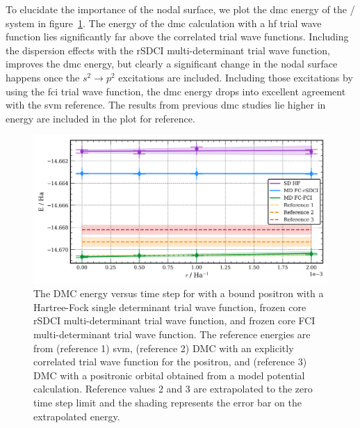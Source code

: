 To elucidate the importance of the nodal surface, we plot the \gls{dmc} energy of the / system in figure~\ref{fig:be_md_extrap}.
The energy of the \gls{dmc} calculation with a \gls{hf} trial wave function lies significantly far above the correlated trial wave functions.
Including the dispersion effects with the \gls{rSDCI} multi-determinant trial wave function, improves the \gls{dmc} energy, but clearly a significant change in the nodal surface happens once the $s^2\rightarrow p^2$ excitations are included.
Including those excitations by using the \gls{fci} trial wave function, the \gls{dmc} energy drops into excellent agreement with the \gls{svm} reference.
The results from previous \gls{dmc} studies lie higher in energy are included in the plot for reference.\cite{10.1021/acs.jctc.1c01193, 10.1063/1.1486447}

\begin{figure}
    \includegraphics[width=\columnwidth,keepaspectratio]{Images/chapter5/be_extrap_multidet.png}
    \caption{\label{fig:be_md_extrap} The DMC energy versus time step for  with a bound positron with a Hartree-Fock single determinant trial wave function, frozen core rSDCI multi-determinant trial wave function, and frozen core FCI multi-determinant trial wave function. The reference energies are from (reference 1) \gls{svm}\cite{10.4208/jams.071510.072110a}, (reference 2) DMC with an explicitly correlated trial wave function for the positron\cite{10.1021/acs.jctc.1c01193}, and (reference 3) DMC with a positronic orbital obtained from a model potential calculation\cite{10.1063/1.1486447}. Reference values 2 and 3 are extrapolated to the zero time step limit and the shading represents the error bar on the extrapolated energy.}
\end{figure}

